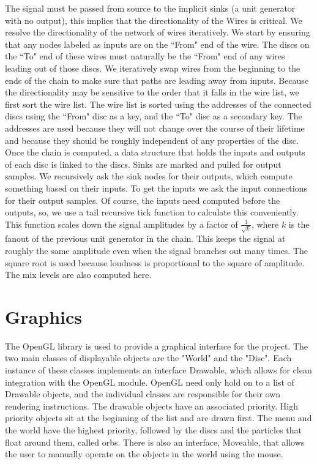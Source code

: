 \documentclass[pdftext,twoside,10pt]{article}
\begin{document}
The signal must be passed from source to the implicit sinks (a unit generator with no output), this implies that the directionality of the Wires is critical. We resolve the directionality of the network of wires iteratively. We start by ensuring that any nodes labeled as inputs are on the ``From" end of the wire. The discs on the ``To" end of these wires must naturally be the ``From" end of any wires leading out of those discs. We iteratively swap wires from the beginning to the ends of the chain to make sure that paths are leading away from inputs. Because the directionality may be sensitive to the order that it falls in the wire list, we first sort the wire list. The wire list is sorted using the addresses of the connected discs using the ``From" disc as a key, and the ``To" disc as a secondary key. The addresses are used because they will not change over the course of their lifetime and because they should be roughly independent of any properties of the disc.\\

Once the chain is computed, a data structure that holds the inputs and outputs of each disc is linked to the discs. Sinks are marked and pulled for output samples. We recursively ask the sink nodes for their outputs, which compute something based on their inputs. To get the inputs we ask the input connections for their output samples. Of course, the inputs need computed before the outputs, so, we use a tail recursive tick function to calculate this conveniently. This function scales down the signal amplitudes by a factor of $\frac{1}{\sqrt{k}}$, where $k$ is the fanout of the previous unit generator in the chain. This keeps the signal at roughly the same amplitude even when the signal branches out many times. The square root is used because loudness is proportional to the square of amplitude. The mix levels are also computed here. 


\section{Graphics}
The OpenGL library is used to provide a graphical interface for the project. The two main classes of displayable objects are the "World" and the "Disc". Each instance of these classes implements an interface Drawable, which allows for clean integration with the OpenGL module. OpenGL need only hold on to a list of Drawable objects, and the individual classes are responsible for their own rendering instructions. The drawable objects have an associated priority. High priority objects sit at the beginning of the list and are drawn first. The menu and the world have the highest priority, followed by the discs and the particles that float around them, called orbs. There is also an interface, Moveable, that allows the user to manually operate on the objects in the world using the mouse.
\end{document}
